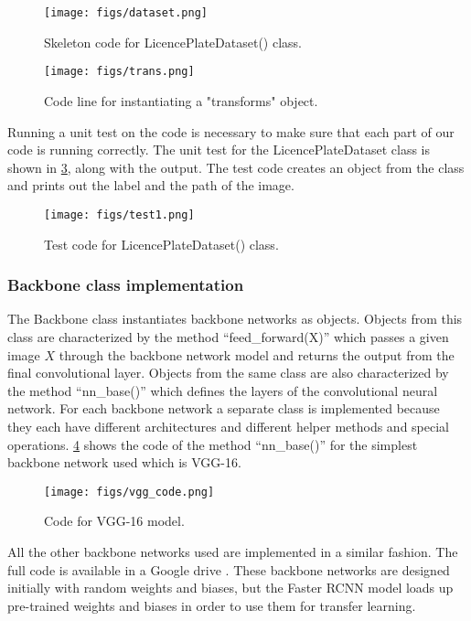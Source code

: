 \begin{figure}[!htpb]
	\centering
	\texttt{[image: figs/dataset.png]}
	\caption{Skeleton code for LicencePlateDataset() class.}\label{fig:dataset}
\end{figure}

\begin{figure}[!htpb]
	\centering
	\texttt{[image: figs/trans.png]}
	\caption{Code line for instantiating a "transforms" object.}\label{fig:trans}
\end{figure}

Running a unit test on the code is necessary to make sure that each part of our code is running correctly. The unit test for the LicencePlateDataset class is shown in \cref{fig:test1}, along with the output. The test code creates an object from the class and prints out the label and the path of the image.

\begin{figure}[!htpb]
	\centering
	\texttt{[image: figs/test1.png]}
	\caption{Test code for LicencePlateDataset() class.}\label{fig:test1}
\end{figure}

\subsubsection{Backbone class implementation}
The Backbone class instantiates backbone networks as objects. Objects from this class are characterized by the method ``feed\_forward(X)'' which passes a given image $X$ through the backbone network model and returns the output from the final convolutional layer. Objects from the same class are also characterized by the method ``nn\_base()'' which defines the layers of the convolutional neural network. For each backbone network a separate class is implemented because they each have different architectures and different helper methods and special operations. \cref{fig:vgg_code} shows the code of the method ``nn\_base()'' for the simplest backbone network used which is VGG-16.

\begin{figure}[!htpb]
	\centering
	\texttt{[image: figs/vgg\_code.png]}
	\caption{Code for VGG-16 model.}\label{fig:vgg_code}
\end{figure}

All the other backbone networks used are implemented in a similar fashion. The full code is available in a Google drive \cite{code}. These backbone networks are designed initially with random weights and biases, but the Faster RCNN model loads up pre-trained weights and biases in order to use them for transfer learning.

